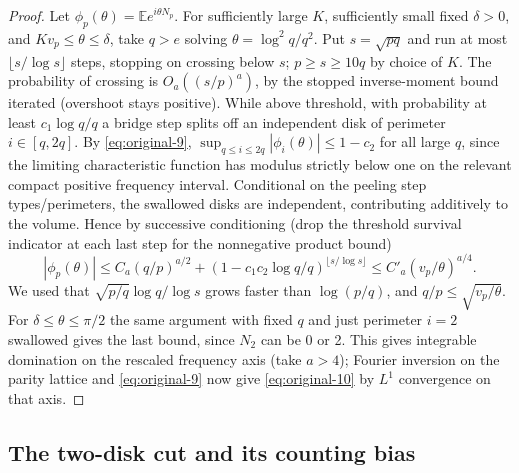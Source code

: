 \begin{proof}
Let \(\phi_p(\theta)=\mathbb E e^{i\theta N_p}\).
For sufficiently large \(K\), sufficiently small fixed \(\delta>0\), and \(K v_p\le\theta\le\delta\), take \(q>e\) solving \(\theta=\log^2 q/q^2\).
Put \(s=\sqrt{pq}\) and run at most \(\lfloor s/\log s\rfloor\) steps, stopping on crossing below \(s\); \(p\ge s\ge10q\) by choice of \(K\).
The probability of crossing is \(O_a((s/p)^a)\), by the stopped inverse-moment bound iterated (overshoot stays positive).
While above threshold, with probability at least \(c_1\log q/q\) a bridge step splits off an independent disk of perimeter \(i\in[q,2q]\).
By \eqref{eq:original-9}, \(\sup_{q\le i\le2q}|\phi_i(\theta)|\le1-c_2\) for all large \(q\), since the limiting characteristic function has modulus strictly below one on the relevant compact positive frequency interval.
Conditional on the peeling step types/perimeters, the swallowed disks are independent, contributing additively to the volume.
Hence by successive conditioning (drop the threshold survival indicator at each last step for the nonnegative product bound)
\[
 |\phi_p(\theta)|\le C_a(q/p)^{a/2}
        +(1-c_1 c_2\log q/q)^{\lfloor s/\log s\rfloor}
 \le C'_a(v_p/\theta)^{a/4}.
\]
We used that \(\sqrt{p/q}\log q/\log s\) grows faster than \(\log(p/q)\), and \(q/p\le\sqrt{v_p/\theta}\).
For \(\delta\le\theta\le\pi/2\) the same argument with fixed \(q\) and just perimeter \(i=2\) swallowed gives the last bound, since \(N_2\) can be 0 or 2.
This gives integrable domination on the rescaled frequency axis (take \(a>4\)); Fourier inversion on the parity lattice and \eqref{eq:original-9} now give \eqref{eq:original-10} by \(L^1\) convergence on that axis.

\end{proof}

\subsection{The two-disk cut and its counting bias}\label{disk:palm-proof}

